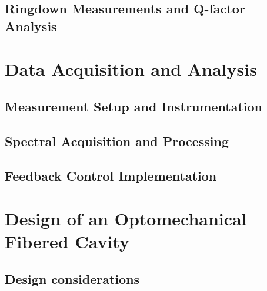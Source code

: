 \subsection{Ringdown Measurements and Q-factor Analysis}
\hspace{1pt}
\section{Data Acquisition and Analysis}
\subsection{Measurement Setup and Instrumentation}
\subsection{Spectral Acquisition and Processing}
\subsection{Feedback Control Implementation}
\hspace{1pt}
\section{Design of an Optomechanical Fibered Cavity}
\subsection{Design considerations}
\newpage 
